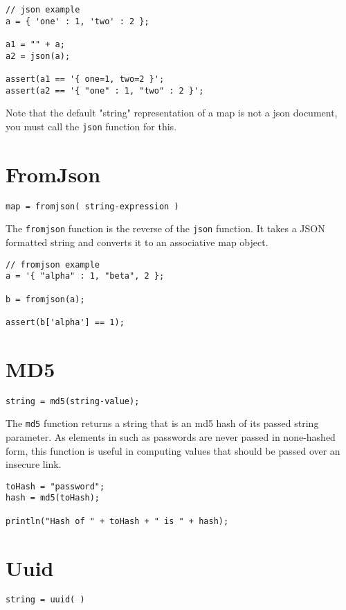 \begin{lstlisting}[caption={Json example}]
// json example
a = { 'one' : 1, 'two' : 2 };

a1 = "" + a;
a2 = json(a);

assert(a1 == '{ one=1, two=2 }';
assert(a2 == '{ "one" : 1, "two" : 2 }';
\end{lstlisting}

Note that the default "string" representation of a map is not a json document, you must call the \Verb+json+ function for this.

\section{FromJson}

\begin{Verbatim}
map = fromjson( string-expression )
\end{Verbatim}

The \Verb+fromjson+ function is the reverse of the \verb+json+ function. It takes a JSON formatted string and converts it to an associative map object.

\begin{lstlisting}[caption={FromJson example}]
// fromjson example
a = '{ "alpha" : 1, "beta", 2 };

b = fromjson(a);

assert(b['alpha'] == 1);

\end{lstlisting}

\section{MD5}
\begin{Verbatim}
string = md5(string-value);
\end{Verbatim}

The \Verb+md5+ function returns a string that is an md5 hash of its passed string parameter. As elements in \Rapture such as passwords are never passed in none-hashed form, this function is useful in computing values that should be passed over an insecure link.

\begin{lstlisting}[caption={MD5 example}]
toHash = "password";
hash = md5(toHash);

println("Hash of " + toHash + " is " + hash);
\end{lstlisting}

\section{Uuid}
\begin{Verbatim}
string = uuid( )
\end{Verbatim}

